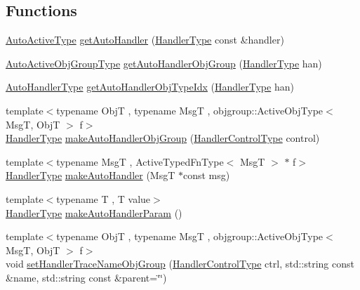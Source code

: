 \subsection*{Functions}
\begin{DoxyCompactItemize}
\item 
\hyperlink{namespacevt_1_1auto__registry_adc4d91d5c7fe1b7d36f2c490ae14c9ac}{Auto\+Active\+Type} \hyperlink{namespacevt_1_1auto__registry_a36290459adff20a355a904f1cce57268}{get\+Auto\+Handler} (\hyperlink{namespacevt_af64846b57dfcaf104da3ef6967917573}{Handler\+Type} const \&handler)
\item 
\hyperlink{namespacevt_1_1auto__registry_a861d9d01e89c81f0a955188724aa25b3}{Auto\+Active\+Obj\+Group\+Type} \hyperlink{namespacevt_1_1auto__registry_a097c75f223a97888d8157568b6ea9bd1}{get\+Auto\+Handler\+Obj\+Group} (\hyperlink{namespacevt_af64846b57dfcaf104da3ef6967917573}{Handler\+Type} han)
\item 
\hyperlink{namespacevt_1_1auto__registry_ae295e18699146815bb7d7674594d95d7}{Auto\+Handler\+Type} \hyperlink{namespacevt_1_1auto__registry_a0c47caf1e4978208704029c0d0f925f0}{get\+Auto\+Handler\+Obj\+Type\+Idx} (\hyperlink{namespacevt_af64846b57dfcaf104da3ef6967917573}{Handler\+Type} han)
\item 
{\footnotesize template$<$typename ObjT , typename MsgT , objgroup\+::\+Active\+Obj\+Type$<$ Msg\+T, Obj\+T $>$ f$>$ }\\\hyperlink{namespacevt_af64846b57dfcaf104da3ef6967917573}{Handler\+Type} \hyperlink{namespacevt_1_1auto__registry_af096c71af57c441be5d6d5f9c1dd52fd}{make\+Auto\+Handler\+Obj\+Group} (\hyperlink{namespacevt_adbbef13b92f0a93b14c219b7cc8a48f2}{Handler\+Control\+Type} control)
\item 
{\footnotesize template$<$typename MsgT , Active\+Typed\+Fn\+Type$<$ Msg\+T $>$ $\ast$ f$>$ }\\\hyperlink{namespacevt_af64846b57dfcaf104da3ef6967917573}{Handler\+Type} \hyperlink{namespacevt_1_1auto__registry_abac49a5da9edd265913ca474a6624a09}{make\+Auto\+Handler} (MsgT $\ast$const msg)
\item 
{\footnotesize template$<$typename T , T value$>$ }\\\hyperlink{namespacevt_af64846b57dfcaf104da3ef6967917573}{Handler\+Type} \hyperlink{namespacevt_1_1auto__registry_a5253f6bb76b4c7e98416fddd05c2695e}{make\+Auto\+Handler\+Param} ()
\item 
{\footnotesize template$<$typename ObjT , typename MsgT , objgroup\+::\+Active\+Obj\+Type$<$ Msg\+T, Obj\+T $>$ f$>$ }\\void \hyperlink{namespacevt_1_1auto__registry_a1eb25883c6f5332dbbf4a61bd22bbf2f}{set\+Handler\+Trace\+Name\+Obj\+Group} (\hyperlink{namespacevt_adbbef13b92f0a93b14c219b7cc8a48f2}{Handler\+Control\+Type} ctrl, std\+::string const \&name, std\+::string const \&parent=\char`\"{}\char`\"{})

\end{DoxyCompactItemize}
